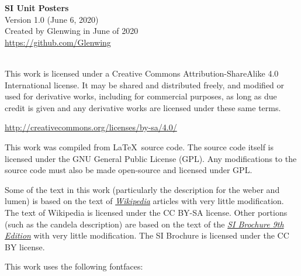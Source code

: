 \documentclass[a4paper]{article}
\renewcommand{\,}{\hspace{0.2em}} %
\begin{document}
\raggedbottom
\nopagecolor %

\thispagestyle{empty}

\begin{center}
	{\Large \textbf{SI Unit Posters}}\\
	\large
	Version 1.0 (June 6, 2020) \\
	Created by Glenwing in June of 2020\\
	\url{https://github.com/Glenwing}\\
	\vspace{1cm}
	\ccLogo~\ccAttribution~\ccShareAlike
	\vspace{1cm}
\end{center}

\setlength\lineskip{0.5em}
\setlength\parskip{1em}
This work is licensed under a Creative Commons Attribution-ShareAlike 4.0 International license. It may be shared and distributed freely, and modified or used for derivative works, including for commercial purposes, as long as due credit is given and any derivative works are licensed under these same terms.

\url{http://creativecommons.org/licenses/by-sa/4.0/}

This work was compiled from \LaTeX\ source code. The source code itself is licensed under the GNU General Public License (GPL). Any modifications to the source code must also be made open-source and licensed under GPL.

Some of the text in this work (particularly the description for the weber and lumen) is based on the text of \href{https://en.wikipedia.org/wiki/Main_Page}{\textsl{Wikipedia}} articles with very little modification. The text of Wikipedia is licensed under the CC BY-SA license. Other portions (such as the candela description) are based on the text of the \href{https://www.bipm.org/utils/common/pdf/si-brochure/SI-Brochure-9-EN.pdf}{\textsl{SI Brochure 9th Edition}} with very little modification. The SI Brochure is licensed under the CC BY license.

This work uses the following fontfaces:
\end{document}
